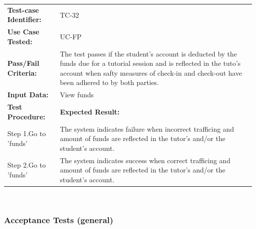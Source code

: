 \documentclass[12pt]{article}
\begin{document}
\begin{tabular}{| p{8cm} | p{8cm} |} \hline
	\textbf{Test-case Identifier:}& TC-32\\
	\textbf{Use Case Tested:}& UC-FP\\
	\textbf{Pass/Fail Criteria:}& The test passes if the student's account is deducted by the funds due for a tutorial session and is reflected in the tuto's account when safty measures of check-in and check-out have been adhered to by both parties.\\
	\textbf{Input Data:}& View funds\\\hline
	\textbf{Test Procedure:}& \textbf{Expected Result:} \\\hline
	Step 1.Go to 'funds' & The system indicates failure when incorrect trafficing and amount of funds are reflected in the tutor's and/or the student's account. \\
	Step 2.Go to 'funds' & The system indicates success when correct trafficing and amount of funds are reflected in the tutor's and/or the student's account. \\
		\hline
\end{tabular}
\\

\subsubsection{Acceptance Tests (general)}
\end{document}
